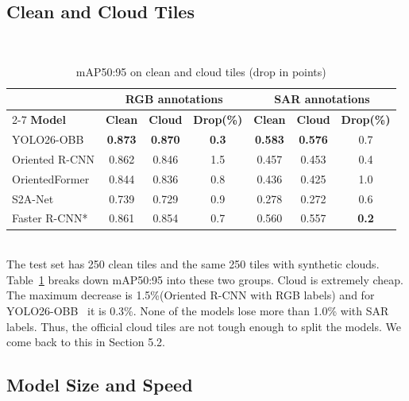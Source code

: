 \subsection{Clean and Cloud Tiles}
\\
\begin{table}[htbp]
\centering

\begin{tabular}{|l|c|c|c|c|c|c|}
\hline
 & \multicolumn{3}{c|}{\textbf{RGB annotations}} & \multicolumn{3}{c|}{\textbf{SAR annotations}} \\
\cline{2-7}
\textbf{Model} & \textbf{Clean} & \textbf{Cloud} & \textbf{Drop(\%)} & \textbf{Clean} & \textbf{Cloud} & \textbf{Drop(\%)} \\
\hline
YOLO26-OBB     & \textbf{0.873} & \textbf{0.870} & \textbf{0.3} & \textbf{0.583} & \textbf{0.576} & 0.7          \\
Oriented R-CNN\cite{xie2021oriented} & 0.862          & 0.846          & 1.5          & 0.457          & 0.453          & 0.4          \\
OrientedFormer & 0.844          & 0.836          & 0.8          & 0.436          & 0.425          & 1.0          \\
S2A-Net        & 0.739          & 0.729          & 0.9          & 0.278          & 0.272          & 0.6          \\
Faster R-CNN*  & 0.861          & 0.854          & 0.7          & 0.560          & 0.557          & \textbf{0.2} \\
\hline
\end{tabular}
\vspace{4pt}
\caption{mAP50:95 on clean and cloud tiles (drop in points)}
\label{tab:cloud_drop}
\end{table}

\\

The test set has 250 clean tiles and the same 250 tiles with synthetic clouds. Table~\ref{tab:cloud_drop} breaks down mAP50:95 into these two groups. Cloud is extremely cheap. The maximum decrease is 1.5\%(Oriented R-CNN with RGB labels) and for YOLO26-OBB~\cite{jocher2026ultralytics} it is 0.3\%. None of the models lose more than 1.0\% with SAR labels. Thus, the official cloud tiles are not tough enough to split the models. We come back to this in Section 5.2.

\subsection{Model Size and Speed}
\\

